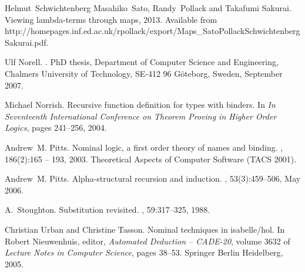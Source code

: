 \documentclass{entcs}
\begin{document}
\begin{thebibliography}{10}
Helmut~Schwichtenberg Masahiko~Sato, Randy~Pollack and Takafumi Sakurai.
\newblock Viewing lambda-terms through maps, 2013.
\newblock Available from
  http://homepages.inf.ed.ac.uk/rpollack/export/Maps\_SatoPollackSchwichtenbergSakurai.pdf.

Ulf Norell.
.
\newblock PhD thesis, Department of Computer Science and Engineering, Chalmers
  University of Technology, SE-412 96 G\"{o}teborg, Sweden, September 2007.

Michael Norrish.
\newblock Recursive function definition for types with binders.
\newblock In {\em In Seventeenth International Conference on Theorem Proving in
  Higher Order Logics}, pages 241--256, 2004.

Andrew~M. Pitts.
\newblock Nominal logic, a first order theory of names and binding.
, 186(2):165 -- 193, 2003.
\newblock Theoretical Aspects of Computer Software (TACS 2001).

Andrew~M. Pitts.
\newblock Alpha-structural recursion and induction.
, 53(3):459--506, May 2006.

A.~Stoughton.
\newblock Substitution revisited.
, 59:317--325, 1988.

Christian Urban and Christine Tasson.
\newblock Nominal techniques in isabelle/hol.
\newblock In Robert Nieuwenhuis, editor, {\em Automated Deduction – CADE-20},
  volume 3632 of {\em Lecture Notes in Computer Science}, pages 38--53.
  Springer Berlin Heidelberg, 2005.

\end{thebibliography}
\end{document}
